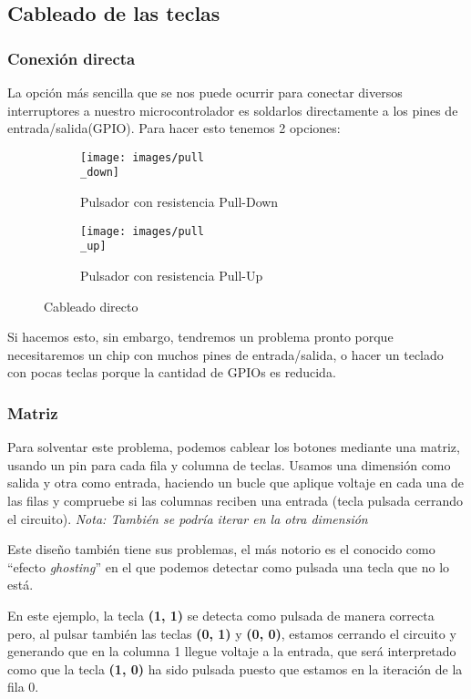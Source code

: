 \subsection{Cableado de las teclas}
    \subsubsection{Conexión directa}
    La opción más sencilla que se nos puede ocurrir para conectar diversos interruptores a nuestro microcontrolador es soldarlos directamente a los pines de entrada/salida(GPIO). Para hacer esto tenemos 2 opciones:
    \begin{figure}[H]
        \begin{subfigure}[b]{.5\textwidth}
          \centering
          \texttt{[image: images/pull\\\_down]}
          \caption{Pulsador con resistencia Pull-Down}
        \end{subfigure} 
        \hfill
        \begin{subfigure}[b]{.5\textwidth}
          \centering
          \texttt{[image: images/pull\\\_up]}
          \caption{Pulsador con resistencia Pull-Up}
        \end{subfigure}
        \caption{Cableado directo}
      \end{figure}
    
    Si hacemos esto, sin embargo, tendremos un problema pronto porque necesitaremos un chip con muchos pines de entrada/salida, o hacer un teclado con pocas teclas porque la cantidad de GPIOs es reducida.

    \subsubsection{Matriz}
    Para solventar este problema, podemos cablear los botones mediante una matriz, usando un pin para cada fila y columna de teclas. Usamos una dimensión como salida y otra como entrada, haciendo un bucle que aplique voltaje en cada una de las filas y compruebe si las columnas reciben una entrada (tecla pulsada cerrando el circuito). \emph{Nota: También se podría iterar en la otra dimensión}

    Este diseño también tiene sus problemas, el más notorio es el conocido como ``efecto \textit{ghosting}'' en el que podemos detectar como pulsada una tecla que no lo está.

    En este ejemplo, la tecla \textbf{(1, 1)} se detecta como pulsada de manera correcta pero, al pulsar también las teclas \textbf{(0, 1)} y \textbf{(0, 0)}, estamos cerrando el circuito y generando que en la columna 1 llegue voltaje a la entrada, que será interpretado como que la tecla \textbf{(1, 0)} ha sido pulsada puesto que estamos en la iteración de la fila 0.\vspace{0.2cm}\par

